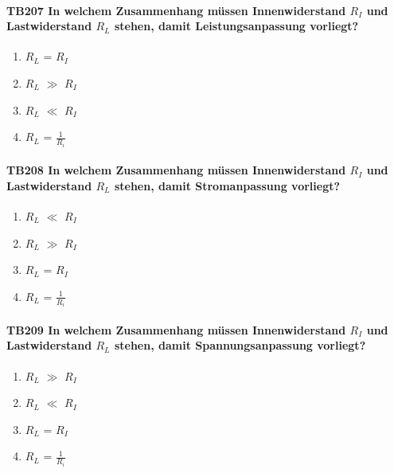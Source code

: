 \documentclass[8pt]{article}
\begin{document}
\begin{enumerate}
\paragraph*{TB207 In welchem Zusammenhang müssen Innenwiderstand $R_{I}$ und Lastwiderstand $R_{L}$ stehen, damit Leistungsanpassung vorliegt?}
\begin{enumerate}[nolistsep,label=\Alph*]
\item $R_{L}$ = $R_{I}$
\item $R_{L}$ $\gg$ $R_{I}$
\item $R_{L}$ $\ll$ $R_{I}$
\item $R_{L}$ = $\frac{1}{R_{i}}$
\end{enumerate}



\paragraph*{TB208 In welchem Zusammenhang müssen Innenwiderstand $R_{I}$ und Lastwiderstand $R_{L}$ stehen, damit Stromanpassung vorliegt?}
\begin{enumerate}[nolistsep,label=\Alph*]
\item $R_{L}$ $\ll$ $R_{I}$
\item $R_{L}$ $\gg$ $R_{I}$
\item $R_{L}$ = $R_{I}$
\item $R_{L}$ = $\frac{1}{R_{i}}$
\end{enumerate} 



\paragraph*{TB209 In welchem Zusammenhang müssen Innenwiderstand $R_{I}$ und Lastwiderstand $R_{L}$ stehen, damit Spannungsanpassung vorliegt?}
\begin{enumerate}[nolistsep,label=\Alph*]
\item $R_{L}$ $\gg$ $R_{I}$
\item $R_{L}$ $\ll$ $R_{I}$
\item $R_{L}$ = $R_{I}$
\item $R_{L}$ = $\frac{1}{R_{i}}$
\end{enumerate}




\end{enumerate}
\end{document}
